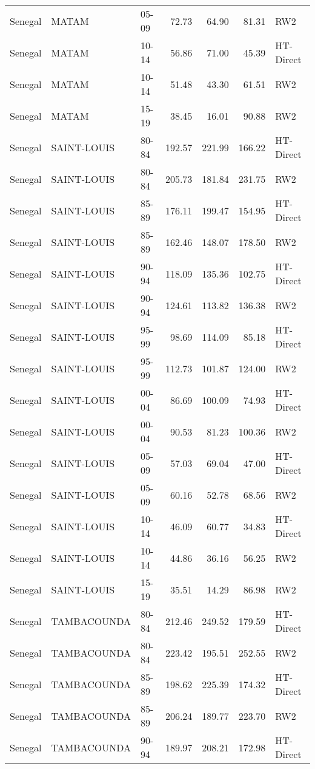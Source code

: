 \begin{longtable}{lllrrrl}
  Senegal & MATAM & 05-09 & 72.73 & 64.90 & 81.31 & RW2 \\ 
  Senegal & MATAM & 10-14 & 56.86 & 71.00 & 45.39 & HT-Direct \\ 
  Senegal & MATAM & 10-14 & 51.48 & 43.30 & 61.51 & RW2 \\ 
  Senegal & MATAM & 15-19 & 38.45 & 16.01 & 90.88 & RW2 \\ 
  Senegal & SAINT-LOUIS & 80-84 & 192.57 & 221.99 & 166.22 & HT-Direct \\ 
  Senegal & SAINT-LOUIS & 80-84 & 205.73 & 181.84 & 231.75 & RW2 \\ 
  Senegal & SAINT-LOUIS & 85-89 & 176.11 & 199.47 & 154.95 & HT-Direct \\ 
  Senegal & SAINT-LOUIS & 85-89 & 162.46 & 148.07 & 178.50 & RW2 \\ 
  Senegal & SAINT-LOUIS & 90-94 & 118.09 & 135.36 & 102.75 & HT-Direct \\ 
  Senegal & SAINT-LOUIS & 90-94 & 124.61 & 113.82 & 136.38 & RW2 \\ 
  Senegal & SAINT-LOUIS & 95-99 & 98.69 & 114.09 & 85.18 & HT-Direct \\ 
  Senegal & SAINT-LOUIS & 95-99 & 112.73 & 101.87 & 124.00 & RW2 \\ 
  Senegal & SAINT-LOUIS & 00-04 & 86.69 & 100.09 & 74.93 & HT-Direct \\ 
  Senegal & SAINT-LOUIS & 00-04 & 90.53 & 81.23 & 100.36 & RW2 \\ 
  Senegal & SAINT-LOUIS & 05-09 & 57.03 & 69.04 & 47.00 & HT-Direct \\ 
  Senegal & SAINT-LOUIS & 05-09 & 60.16 & 52.78 & 68.56 & RW2 \\ 
  Senegal & SAINT-LOUIS & 10-14 & 46.09 & 60.77 & 34.83 & HT-Direct \\ 
  Senegal & SAINT-LOUIS & 10-14 & 44.86 & 36.16 & 56.25 & RW2 \\ 
  Senegal & SAINT-LOUIS & 15-19 & 35.51 & 14.29 & 86.98 & RW2 \\ 
  Senegal & TAMBACOUNDA & 80-84 & 212.46 & 249.52 & 179.59 & HT-Direct \\ 
  Senegal & TAMBACOUNDA & 80-84 & 223.42 & 195.51 & 252.55 & RW2 \\ 
  Senegal & TAMBACOUNDA & 85-89 & 198.62 & 225.39 & 174.32 & HT-Direct \\ 
  Senegal & TAMBACOUNDA & 85-89 & 206.24 & 189.77 & 223.70 & RW2 \\ 
  Senegal & TAMBACOUNDA & 90-94 & 189.97 & 208.21 & 172.98 & HT-Direct \\ 

\end{longtable}
